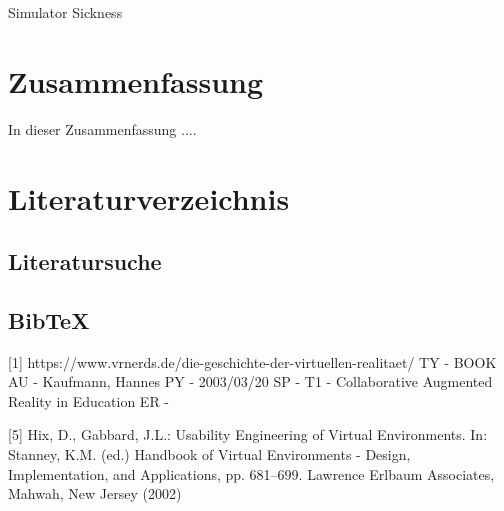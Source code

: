 \documentclass[deutsch]{llncs}
\begin{document}
Simulator Sickness



\section{Zusammenfassung}
\label{sec:typo}
In dieser Zusammenfassung .... 

\section{Literaturverzeichnis}
\label{sec:bib}

\subsection{Literatursuche}
\label{subsec:search}


\subsection{BibTeX}
\label{subsec:bibtex}
[1] https://www.vrnerds.de/die-geschichte-der-virtuellen-realitaet/
\cite{2 http://virtualrealityforeducation.com/wp-content/uploads/2018/06/HuAu_Lee_2017_VRinEd.pdf}
TY  - BOOK
AU  - Kaufmann, Hannes
PY  - 2003/03/20
SP  - 
T1  - Collaborative Augmented Reality in Education
ER  - 
\printbibliography

[5] Hix, D., Gabbard, J.L.: Usability Engineering of Virtual Environments. In: Stanney, K.M.
(ed.) Handbook of Virtual Environments - Design, Implementation, and Applications, pp.
681–699. Lawrence Erlbaum Associates, Mahwah, New Jersey (2002)
\end{document}
